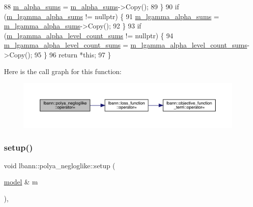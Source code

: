\begin{DoxyCode}
88     \hyperlink{classlbann_1_1polya__negloglike_aa77620f256de700ae8b3ca921957bcd1}{m\_alpha\_sums} = \hyperlink{classlbann_1_1polya__negloglike_aa77620f256de700ae8b3ca921957bcd1}{m\_alpha\_sums}->Copy();
89   \}
90   \textcolor{keywordflow}{if} (\hyperlink{classlbann_1_1polya__negloglike_a0aec768ffa50a8b716149d597699eddb}{m\_lgamma\_alpha\_sums} != \textcolor{keyword}{nullptr}) \{
91     \hyperlink{classlbann_1_1polya__negloglike_a0aec768ffa50a8b716149d597699eddb}{m\_lgamma\_alpha\_sums} = \hyperlink{classlbann_1_1polya__negloglike_a0aec768ffa50a8b716149d597699eddb}{m\_lgamma\_alpha\_sums}->Copy();
92   \}
93   \textcolor{keywordflow}{if} (\hyperlink{classlbann_1_1polya__negloglike_a78c9da1fb83c7b79a12cfbf30a4cb59e}{m\_lgamma\_alpha\_level\_count\_sums} != \textcolor{keyword}{nullptr}) \{
94     \hyperlink{classlbann_1_1polya__negloglike_a78c9da1fb83c7b79a12cfbf30a4cb59e}{m\_lgamma\_alpha\_level\_count\_sums} = 
      \hyperlink{classlbann_1_1polya__negloglike_a78c9da1fb83c7b79a12cfbf30a4cb59e}{m\_lgamma\_alpha\_level\_count\_sums}->Copy();
95   \}
96   \textcolor{keywordflow}{return} *\textcolor{keyword}{this};
97 \}
\end{DoxyCode}
Here is the call graph for this function\+:\nopagebreak
\begin{figure}[H]
\begin{center}
\leavevmode
\includegraphics[width=350pt]{classlbann_1_1polya__negloglike_a13d1e4b96c6e99bb39afc2b349ad9588_cgraph}
\end{center}
\end{figure}
\mbox{\label{classlbann_1_1polya__negloglike_a4a7ae8eef1ef216f60b158acb1853355}} 
\subsubsection{\texorpdfstring{setup()}{setup()}}
{\footnotesize\ttfamily void lbann\+::polya\+\_\+negloglike\+::setup (\begin{DoxyParamCaption}\item[{\hyperlink{classlbann_1_1model}{model} \&}]{m }\end{DoxyParamCaption})\hspace{0.3cm}{\ttfamily [override]}, {\ttfamily [virtual]}}

